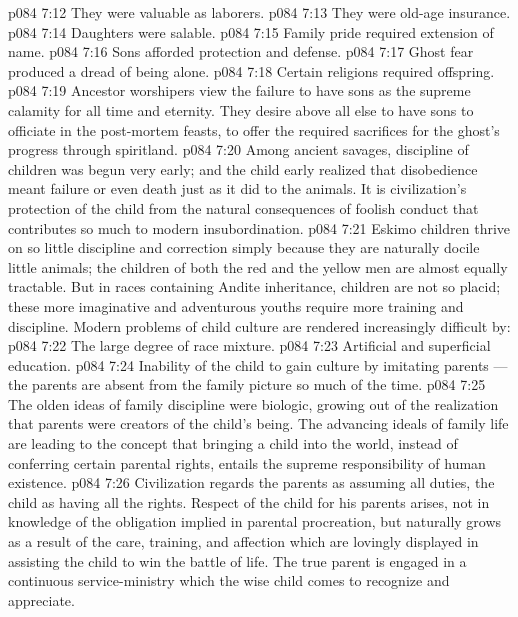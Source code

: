 \vs p084 7:12 \bibnobreakspace They were valuable as laborers.
\vs p084 7:13 \bibnobreakspace They were old\hyp{}age insurance.
\vs p084 7:14 \bibnobreakspace Daughters were salable.
\vs p084 7:15 \bibnobreakspace Family pride required extension of name.
\vs p084 7:16 \bibnobreakspace Sons afforded protection and defense.
\vs p084 7:17 \bibnobreakspace Ghost fear produced a dread of being alone.
\vs p084 7:18 \bibnobreakspace Certain religions required offspring.
\vs p084 7:19 \pc Ancestor worshipers view the failure to have sons as the supreme calamity for all time and eternity. They desire above all else to have sons to officiate in the post\hyp{}mortem feasts, to offer the required sacrifices for the ghost’s progress through spiritland.
\vs p084 7:20 Among ancient savages, discipline of children was begun very early; and the child early realized that disobedience meant failure or even death just as it did to the animals. It is civilization’s protection of the child from the natural consequences of foolish conduct that contributes so much to modern insubordination.
\vs p084 7:21 Eskimo children thrive on so little discipline and correction simply because they are naturally docile little animals; the children of both the red and the yellow men are almost equally tractable. But in races containing Andite inheritance, children are not so placid; these more imaginative and adventurous youths require more training and discipline. Modern problems of child culture are rendered increasingly difficult by:
\vs p084 7:22 \bibnobreakspace The large degree of race mixture.
\vs p084 7:23 \bibnobreakspace Artificial and superficial education.
\vs p084 7:24 \bibnobreakspace Inability of the child to gain culture by imitating parents --- the parents are absent from the family picture so much of the time.
\vs p084 7:25 \pc The olden ideas of family discipline were biologic, growing out of the realization that parents were creators of the child’s being. The advancing ideals of family life are leading to the concept that bringing a child into the world, instead of conferring certain parental rights, entails the supreme responsibility of human existence.
\vs p084 7:26 Civilization regards the parents as assuming all duties, the child as having all the rights. Respect of the child for his parents arises, not in knowledge of the obligation implied in parental procreation, but naturally grows as a result of the care, training, and affection which are lovingly displayed in assisting the child to win the battle of life. The true parent is engaged in a continuous service\hyp{}ministry which the wise child comes to recognize and appreciate.

